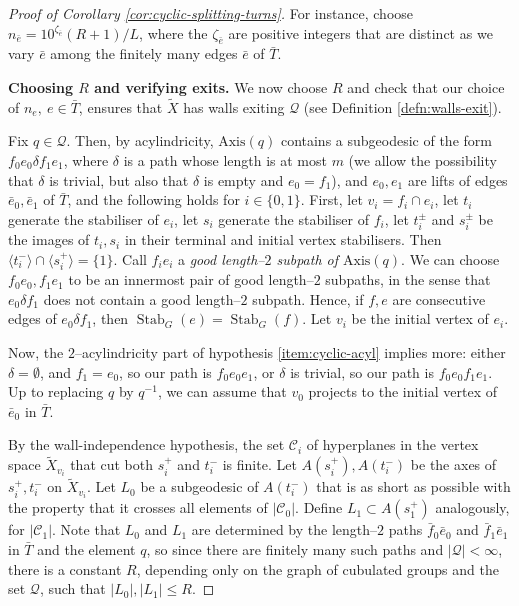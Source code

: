 \documentclass[11pt,oneside]{amsart}
\newcounter{ax}
\theoremstyle{definition}
\DeclareMathOperator{\stabilizer}{Stab}
\newcommand{\axis}{\mathrm{Axis}}
\begin{document}
\begin{proof}[Proof of Corollary \ref{cor:cyclic-splitting-turns}]
For instance, choose $n_{\bar e}=10^{\zeta_{\bar e}}(R+1)/L$, where the $\zeta_{\bar e}$ are positive integers that are distinct as we vary $\bar e$ among the finitely many edges $\bar e$ of $\bar T$.



\textbf{Choosing $R$ and verifying exits.}  We now choose $R$ and check that our choice of $n_e,\ e\in\bar T$, ensures that $\widetilde X$ has walls exiting $\mathcal Q$ (see Definition \ref{defn:walls-exit}).

Fix $q\in\mathcal Q$.  Then, by acylindricity, $\axis(q)$ contains a subgeodesic of the form $f_0e_0\delta f_1e_1$, where $\delta$ is a path whose length is at most $m$ (we allow the possibility that $\delta$ is trivial, but also that $\delta$ is empty and $e_0=f_1$), and $e_0,e_1$ are lifts of edges $\bar e_0,\bar e_1$ of $\bar T$, and the following holds for $i\in\{0,1\}$.  First, let $v_i=f_i\cap e_i$, let $t_i$ generate the stabiliser of $e_i$, let $s_i$ generate the stabiliser of $f_i$, let $t_i^\pm$ and $s_i^\pm$ be the images of $t_i,s_i$ in their terminal and initial vertex stabilisers.  Then $\langle t_i^-\rangle\cap \langle s_i^+\rangle=\{1\}$.  Call $f_ie_i$ a \emph{good length--$2$ subpath of $\axis(q)$}.  We can choose $f_0e_0,f_1e_1$ to be an innermost pair of good length--$2$ subpaths, in the sense that $e_0\delta f_1$ does not contain a good length--$2$ subpath.  Hence, if $f,e$ are consecutive edges of $e_0\delta f_1$, then $\stabilizer_G(e)=\stabilizer_G(f)$.  Let $v_i$ be the initial vertex of $e_i$.

Now, the $2$--acylindricity part of hypothesis \eqref{item:cyclic-acyl}  implies more: either $\delta=\emptyset$, and $f_1=e_0$, so our path is $f_0e_0e_1$, or $\delta$ is trivial, so our path is $f_0e_0f_1e_1$.  Up to replacing $q$ by $q^{-1}$, we can assume that $v_0$ projects to the initial vertex of $\bar e_0$ in $\bar T$.    

By the wall-independence hypothesis, the set $\mathcal C_i$ of hyperplanes in the vertex space $\widetilde X_{v_i}$ that cut both $s_i^+$ and $t_i^-$ is finite.  Let $A(s_i^+),A(t_i^-)$ be the axes of $s_i^+,t_i^-$ on $\widetilde X_{v_i}$.  Let $L_0$ be a subgeodesic of $A(t_i^-)$ that is as short as possible with the property that it crosses all elements of $|\mathcal C_0|$.  Define $L_1\subset A(s_1^+)$ analogously, for $|\mathcal C_1|$.  Note that $L_0$ and $L_1$ are determined by the length--$2$ paths $\bar f_0\bar e_0$ and $\bar f_1\bar e_1$ in $\bar T$ and the element $q$, so since there are finitely many such paths and $|\mathcal Q|<\infty$, there is a constant $R$, depending only on the graph of cubulated groups and the set $\mathcal Q$, such that $|L_0|,|L_1|\leq R$.  


\end{proof}
\end{document}

